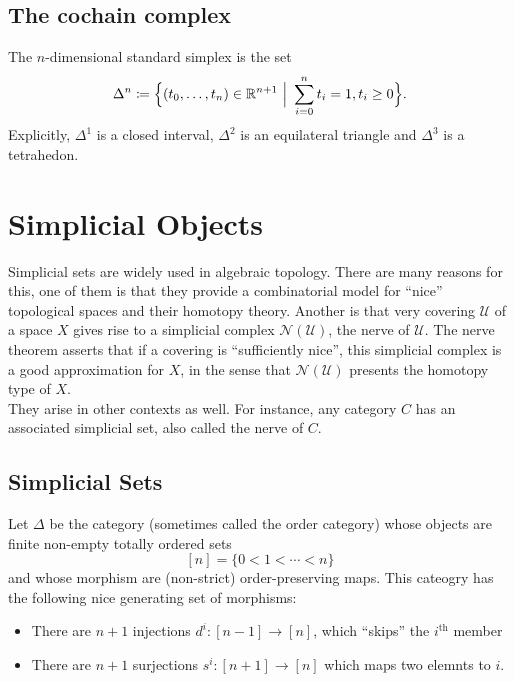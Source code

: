 \subsection{The cochain complex}
\begin{definition}
  The $n$-dimensional standard simplex is the set
  \[
    \Delta^n \coloneqq \Big\{ (t_0, \dots , t_n) \in \mathbb{R}^{n+1} \ \Big\vert \ \sum_{i = 0}^n t_i = 1, t_i \ge 0 \Big\} .
  \]
  Explicitly, $\Delta^1$ is a closed interval, $\Delta^2$ is an equilateral triangle and $\Delta^3$ is a tetrahedon.
  
\end{definition}

\section{Simplicial Objects}


Simplicial sets are widely used in algebraic topology. There are many reasons for this, one of them is that they provide a combinatorial model for ``nice'' topological spaces and their homotopy theory. Another is that very covering $\mathcal{U}$ of a space $X$ gives rise to a simplicial complex $\mathcal{N(U)}$, the nerve of $\mathcal{U}$. The nerve theorem asserts that if a covering is ``sufficiently nice'', this simplicial complex is a good approximation for $X$, in the sense that $\mathcal{N(U)}$ presents the homotopy type of $X$.\\

They arise in other contexts as well. For instance, any category $C$ has an associated simplicial set, also called the nerve of $C$.

\subsection{Simplicial Sets}
Let $\Delta$ be the category (sometimes called the order category) whose objects are finite non-empty totally ordered sets 
\[ [n] = \{0<1<\cdots<n\}\]
and whose morphism are (non-strict) order-preserving maps. This cateogry has the following nice generating set of morphisms:
\begin{itemize}
  \item There are $n+1$ injections $d^i: [n-1] \to [n]$, which ``skips'' the $i^{\text{th}}$ member
  \item There are $n+1$ surjections $s^i: [n+1] \to [n]$ which maps two elemnts to $i$.
\end{itemize}

